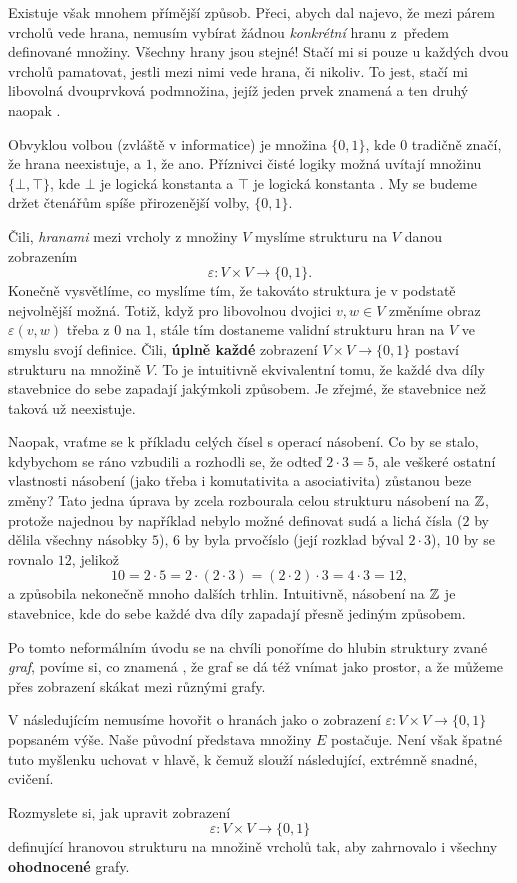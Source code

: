 Existuje však mnohem přímější způsob. Přeci, abych dal najevo, že mezi párem
vrcholů vede hrana, nemusím vybírat žádnou \emph{konkrétní} hranu z~předem
definované množiny. Všechny hrany jsou stejné! Stačí mi si pouze u každých dvou
vrcholů pamatovat, jestli mezi nimi vede hrana, či nikoliv. To jest, stačí mi
libovolná dvouprvková podmnožina, jejíž jeden prvek znamená  a ten druhý naopak .

Obvyklou volbou (zvláště v informatice) je množina $\{0,1\}$, kde $0$ tradičně
značí, že hrana neexistuje, a $1$, že ano. Příznivci čisté logiky možná uvítají
množinu $\{\bot,\top\}$, kde $\bot$ je logická konstanta  a $\top$ je
logická konstanta . My se budeme držet čtenářům spíše přirozenější
volby, $\{0,1\}$.

Čili, \emph{hranami} mezi vrcholy z množiny $V$ myslíme strukturu na $V$ danou
zobrazením
\[
 \varepsilon:V \times V \to \{0,1\}.
\]
Konečně vysvětlíme, co myslíme tím, že takováto struktura je v podstatě
nejvolnější možná. Totiž, když pro libovolnou dvojici $v,w \in V$ změníme obraz
$\varepsilon(v,w)$ třeba z $0$ na $1$, stále tím dostaneme validní strukturu
hran na $V$ ve smyslu svojí definice. Čili, \textbf{úplně každé} zobrazení $V
\times V \to \{0,1\}$ postaví strukturu na množině $V$. To je intuitivně
ekvivalentní tomu, že každé dva díly stavebnice do sebe zapadají jakýmkoli
způsobem. Je zřejmé, že  stavebnice než taková už neexistuje.

Naopak, vraťme se k příkladu celých čísel s operací násobení. Co by se stalo,
kdybychom se ráno vzbudili a rozhodli se, že odteď $2 \cdot 3 = 5$, ale veškeré
ostatní vlastnosti násobení (jako třeba i komutativita a asociativita) zůstanou
beze změny? Tato jedna úprava by zcela rozbourala celou strukturu násobení na
$\mathbb{Z}$, protože najednou by například nebylo možné definovat sudá a lichá čísla
($2$ by dělila všechny násobky $5$), $6$ by byla prvočíslo (její rozklad býval
$2 \cdot 3$), $10$ by se rovnalo $12$, jelikož
\[
 10 = 2 \cdot 5 = 2 \cdot (2 \cdot 3) = (2 \cdot 2) \cdot 3 = 4 \cdot 3 = 12,
\]
a způsobila nekonečně mnoho dalších trhlin. Intuitivně, násobení na $\mathbb{Z}$ je
stavebnice, kde do sebe každé dva díly zapadají přesně jediným způsobem.

Po tomto neformálním úvodu se na chvíli ponoříme do hlubin struktury zvané
\emph{graf}, povíme si, co znamená , že graf se dá též vnímat
jako prostor, a že můžeme přes zobrazení skákat mezi různými grafy.

V následujícím nemusíme hovořit o hranách jako o zobrazení $\varepsilon:V \times
V \to \{0,1\}$ popsaném výše. Naše původní představa množiny $E$ postačuje. Není
však špatné tuto myšlenku uchovat v hlavě, k čemuž slouží následující, extrémně
snadné, cvičení.

\begin{exercise}
 Rozmyslete si, jak upravit zobrazení
 \[
  \varepsilon:V \times V \to \{0,1\}
 \]
 definující hranovou strukturu na množině vrcholů tak, aby zahrnovalo i všechny
 \textbf{ohodnocené} grafy.
\end{exercise}


